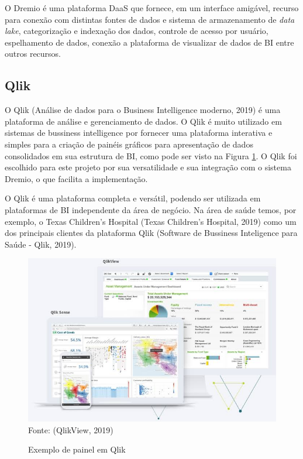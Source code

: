 \documentclass[
	12pt,				%
	openright,			%
	oneside,			%
	a4paper,			%
	chapter=TITLE,		%
	section=TITLE,		%
	subsection=TITLE,	%
	subsubsection=TITLE,%
	english,			%
	brazil				%
	]{abntex2}
\theoremstyle{definition}
\begin{document}
    O Dremio é uma plataforma DaaS que fornece, em um interface amigável, recurso para conexão com distintas fontes de dados e sistema de armazenamento de \textit{data lake}, categorização e indexação dos dados, controle de acesso por usuário, espelhamento de dados, conexão a plataforma de visualizar de dados de BI entre outros recursos.
    
\subsection{Qlik}
    
    O Qlik (Análise de dados para o Business Intelligence moderno, 2019) é uma plataforma de análise e gerenciamento de dados. O Qlik é muito utilizado em sistemas de bussiness intelligence por fornecer uma plataforma interativa e simples para a criação de painéis gráficos para apresentação de dados consolidados em sua estrutura de BI, como pode ser visto na Figura \ref{exemplo qlik}. O Qlik foi escolhido para este projeto por sua versatilidade e sua integração com o sistema Dremio, o que facilita a implementação.

    O Qlik é uma plataforma completa e versátil, podendo ser utilizada em plataformas de BI independente da área de negócio. Na área de saúde temos, por exemplo, o Texas Children's Hospital (Texas Children's Hospital, 2019) como um dos principais clientes da plataforma Qlik (Software de Bussiness Inteligence para Saúde - Qlik, 2019).
    
    \begin{figure}[H]
         \centering
         \caption{Exemplo de painel em Qlik}
         \includegraphics[scale=0.6]{imagens/qlik.jpg}
         \\{\footnotesize Fonte: (QlikView, 2019)}
         \label{exemplo qlik}
    \end{figure}
    
\end{document}
